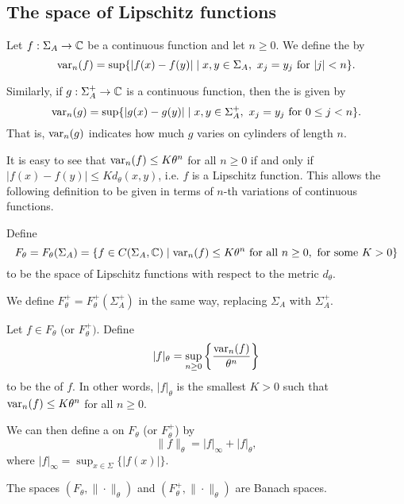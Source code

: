 \subsection{The space of Lipschitz functions}
\begin{definition}
	Let $f : \Sigma_A \to \mathbb{C}$ be a continuous function and let $n \geq 0$. We define the  by
	\[
		\operatorname{var}_n(f) = \sup\{|f(x) - f(y)| \mid x, y \in \Sigma_A,\ x_j = y_j \text{ for } |j| < n\}.
	\]
	
	Similarly, if $g : \Sigma_A^+ \to \mathbb{C}$ is a continuous function, then the  is given by
	\[
	\operatorname{var}_n(g) = \sup\{|g(x) - g(y)| \mid x, y \in \Sigma_A^+,\ x_j = y_j \text{ for } 0 \leq j < n\}.
	\]
	That is, $\operatorname{var}_n(g)$ indicates how much $g$ varies on cylinders of length $n$.~\cite[Lecture 8]{magic-ergodic}
\end{definition}

It is easy to see that $\operatorname{var}_n(f) \leq K\theta^n$ for all $n \geq 0$ if and only if $|f(x) - f(y)| \leq Kd_\theta(x, y)$, i.e. $f$ is a Lipschitz function. This allows the following definition to be given in terms of $n$-th variations of continuous functions.

\begin{definition}
	Define
	\[
		F_\theta = F_\theta(\Sigma_A) = \{f \in C(\Sigma_A, \mathbb{C}) \mid \operatorname{var}_n(f) \leq K\theta^n \text{ for all } n \geq 0, \text{ for some } K > 0\}
	\]
	to be the space of Lipschitz functions with respect to the metric $d_\theta$.
	
	We define $F_\theta^+ = F_\theta^+(\Sigma_A^+)$ in the same way, replacing $\Sigma_A$ with $\Sigma_A^+$.
\end{definition}

\begin{definition}
	Let $f \in F_\theta$ (or $F_\theta^+)$. Define
	\[
		|f|_\theta = \sup_{n \geq 0}\left\{\frac{\operatorname{var}_n(f)}{\theta^n}\right\}
	\]
	to be the  of $f$. In other words, $|f|_\theta$ is the smallest $K > 0$ such that $\operatorname{var}_n(f) \leq K\theta^n$ for all $n \geq 0$.
	
	We can then define a  on $F_\theta$ (or $F_\theta^+$) by
	\[
		\|f\|_\theta = |f|_\infty+ |f|_\theta,
	\]
	where $|f|_\infty = \sup_{x \in \Sigma}\{|f(x)|\}$.
\end{definition}

\begin{proposition}
	The spaces $(F_\theta, \|\cdot\|_\theta)$ and $(F_\theta^+, \|\cdot\|_\theta)$ are Banach spaces.
\end{proposition}

